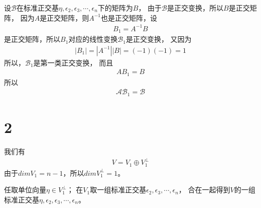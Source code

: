 \documentclass{article}
\begin{document}
\begin{itemize}
        设$\mathscr{B}$在标准正交基$\eta, \epsilon_2, \epsilon_3, \cdots, \epsilon_n$下的矩阵为$B$，
        由于$\mathscr{B}$是正交变换，所以$B$是正交矩阵，
        因为$A$是正交矩阵，则$A^{-1}$也是正交矩阵，设
        \begin{align*}
          B_1 = A^{-1} B
        \end{align*}
        是正交矩阵，所以$B_1$对应的线性变换$\mathscr{B}_1$是正交变换，
        又因为
        \begin{align*}
          |B_1| = |A^{-1}| |B| = (-1) (-1) = 1
        \end{align*}
        所以，$\mathscr{B}_1$是第一类正交变换，
        而且
        \begin{align*}
          A B_1 = B
        \end{align*}
        所以
        \begin{align*}
          \mathscr{A} \mathscr{B_1} = \mathscr{B}
        \end{align*}
\end{itemize}

\section*{2}

我们有
\begin{align*}
  V = V_1 \oplus V_1^\bot
\end{align*}
由于$dim V_1 = n - 1$，所以$dim V_1^\bot = 1$。

任取单位向量$\eta \in V_{1}^\bot$；
在$V_{1}$取一组标准正交基$\epsilon_2, \epsilon_3, \cdots, \epsilon_n$，
合在一起得到$V$的一组标准正交基$\eta, \epsilon_2, \epsilon_3, \cdots, \epsilon_n$。
\end{document}
